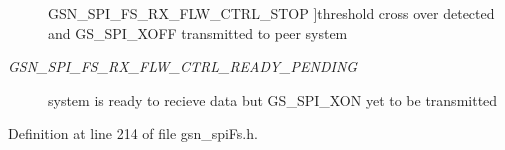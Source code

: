 \begin{Desc}
\begin{description}
{{GSN\_\-SPI\_\-FS\_\-RX\_\-FLW\_\-CTRL\_\-STOP}
\label{a00589_a8fba8ef99bde7d11e4f9178b501de8cda4f3aef972e12fcc591f47b0839b30680}
}]threshold cross over detected and GS\_\-SPI\_\-XOFF transmitted to peer system \item[{\em 
\hypertarget{a00589_a8fba8ef99bde7d11e4f9178b501de8cdaebbaf2a55c30563b6e3f7cd52bd7a82f}{
GSN\_\-SPI\_\-FS\_\-RX\_\-FLW\_\-CTRL\_\-READY\_\-PENDING}
\label{a00589_a8fba8ef99bde7d11e4f9178b501de8cdaebbaf2a55c30563b6e3f7cd52bd7a82f}
}]system is ready to recieve data but GS\_\-SPI\_\-XON yet to be transmitted \end{description}
\end{Desc}



Definition at line 214 of file gsn\_\-spiFs.h.

